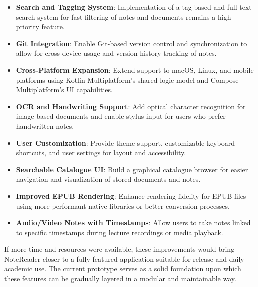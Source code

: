 \begin{itemize}
    \item \textbf{Search and Tagging System}: Implementation of a tag-based and full-text search system for fast filtering of notes and documents remains a high-priority feature.
    \item \textbf{Git Integration}: Enable Git-based version control and synchronization to allow for cross-device usage and version history tracking of notes.
    \item \textbf{Cross-Platform Expansion}: Extend support to macOS, Linux, and mobile platforms using Kotlin Multiplatform’s shared logic model and Compose Multiplatform's UI capabilities.
    \item \textbf{OCR and Handwriting Support}: Add optical character recognition for image-based documents and enable stylus input for users who prefer handwritten notes.
    \item \textbf{User Customization}: Provide theme support, customizable keyboard shortcuts, and user settings for layout and accessibility.
    \item \textbf{Searchable Catalogue UI}: Build a graphical catalogue browser for easier navigation and visualization of stored documents and notes.
    \item \textbf{Improved EPUB Rendering}: Enhance rendering fidelity for EPUB files using more performant native libraries or better conversion processes.
    \item \textbf{Audio/Video Notes with Timestamps}: Allow users to take notes linked to specific timestamps during lecture recordings or media playback.
\end{itemize}

If more time and resources were available, these improvements would bring NoteReader closer to a fully featured application suitable for release and daily academic use. The current prototype serves as a solid foundation upon which these features can be gradually layered in a modular and maintainable way.